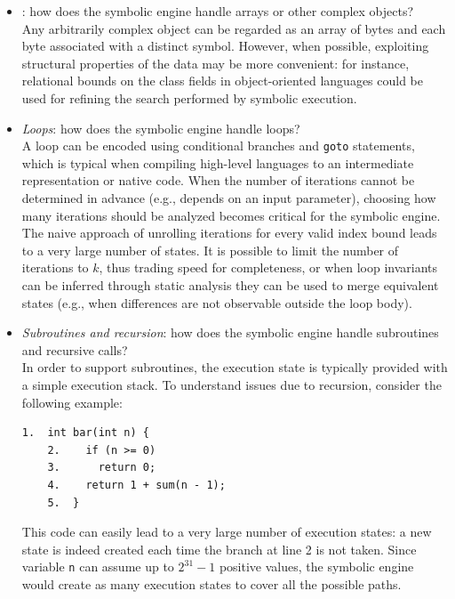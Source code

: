 \begin{itemize}

\item {}: how does the symbolic engine handle arrays or other complex objects? \\
Any arbitrarily complex object can be regarded as an array of bytes and each byte associated with a distinct symbol. However, when possible, exploiting structural properties of the data may be more convenient: for instance, relational bounds on the class fields in object-oriented languages could be used for refining the search performed by symbolic execution.
\vspace{1mm}

  \item {\em Loops}: how does the symbolic engine handle loops? \\
A loop can be encoded using conditional branches and {\tt goto} statements, which is typical  when compiling high-level languages to an intermediate representation or native code. When the number of iterations cannot be determined in advance (e.g., depends on an input parameter),  choosing how many iterations should be analyzed becomes critical for the symbolic engine. The naive approach of unrolling iterations for every valid index bound leads to a very large number of states. It is possible to limit the number of iterations to $k$, thus trading speed for completeness, or when loop invariants can be inferred through static analysis they can be used to merge equivalent states (e.g., when differences are not observable outside the loop body).
\vspace{1mm}

  \item {\em Subroutines and recursion}: how does the symbolic engine handle subroutines and recursive calls? \\
In order to support subroutines, the execution state is typically provided with a simple execution stack. To understand issues due to recursion, consider the following example:
    \begin{lstlisting}[basicstyle=\ttfamily\small]
    1.  int bar(int n) {
    2.    if (n >= 0) 
    3.      return 0;
    4.    return 1 + sum(n - 1);
    5.  }
    \end{lstlisting}
This code can easily lead to a very large number of execution states: a new state is indeed created each time the branch at line 2 is not taken. Since variable {\tt n} can assume up to  $2^{31} - 1$ positive values, the symbolic engine would create as many execution states to cover all the possible paths.
 \vspace{1mm}


\end{itemize}
